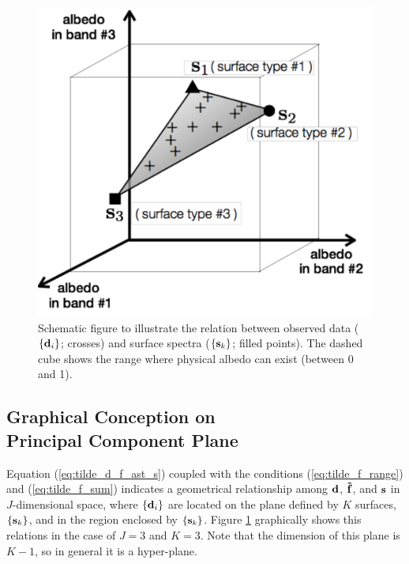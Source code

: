 \documentclass[iop,numberedappendix,apj]{emulateapj}
\def\fast{\tilde f}
\def\memoYF#1{\color{red}[YF: {\bf #1}]\color{black}}
\begin{document}
\begin{figure}[b!]
    \begin{center}
\includegraphics[width=0.8\hsize]{schematics_ver3.pdf}
    \end{center}
    \caption{Schematic figure to illustrate the relation between observed data ($\{{\bf d}_i\} $; crosses) and surface spectra ($\{{\bf s}_k\} $; filled points). The dashed cube shows the range where physical albedo can exist (between 0 and 1). }
\label{fig:schematic}
\end{figure}


\subsection{Graphical Conception on \\Principal Component Plane}
\label{ss:PCplane}


Equation (\ref{eq:tilde_d_f_ast_s}) coupled with the conditions (\ref{eq:tilde_f_range}) and (\ref{eq:tilde_f_sum}) indicates a geometrical relationship among ${\bf d}$, ${\bf \fast }$, and ${\bf s}$ in 
$J$-dimensional space, where $\{{\bf d}_i\}$ are located on the plane defined by $K$ surfaces, $\{{\bf s}_k\} $, and in the region enclosed by $\{{\bf s}_k\} $. 
Figure \ref{fig:schematic} graphically shows this relations in the case of $J=3$ and $K=3$. 
Note that the dimension of this plane is $K-1$, so in general it is a hyper-plane.  
\end{document}
